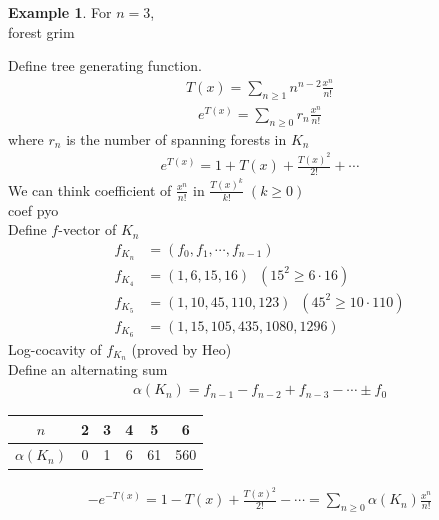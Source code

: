 \documentclass{article}
\theoremstyle{definition}
\newtheorem{ex}{Example}[]
\begin{document}
\begin{ex}
    For $n=3$, \\ 
    forest grim
\end{ex}
Define tree generating function. 
\begin{align*}
    T(x) = \sum_{n \ge 1} n^{n-2} \frac{x^n}{n!} 
\end{align*}
\begin{align*}
    e^{T(x)} = \sum_{n\ge 0} r_n \frac{x^n}{n!} 
\end{align*}
where $r_n$ is the number of spanning forests in $K_n$
\begin{align*}
    e^{T(x)} = 1 + T(x) + \frac{T(x)^2}{2!} + \cdots
\end{align*}
We can think coefficient of $\frac{x^n}{n!}$ in $\frac{T(x)^k}{k!} \; (k\ge 0)$ \\ 
coef pyo \\ 
Define $f$-vector of $K_n$ 
\begin{align*}
    f_{K_n} &= (f_0, f_1, \cdots , f_{n-1}) \\ 
    f_{K_4} &= (1, 6, 15, 16) \;\; (15^2 \ge 6 \cdot 16)\\ 
    f_{K_5} &= (1, 10, 45, 110, 123)  \;\; (45^2 \ge 10 \cdot 110)\\ 
    f_{K_6} &= (1, 15, 105, 435, 1080, 1296)
\end{align*}
Log-cocavity of $f_{K_n}$ (proved by Heo) \\ 
Define an alternating sum 
\begin{align*}
    \alpha (K_n) = f_{n-1} - f_{n-2} + f_{n-3} - \cdots \pm f_0
\end{align*}
\begin{center}
    \begin{tabular}{c|ccccc}
        $n$ & 2 & 3 & 4 & 5 & 6 \\ 
        \hline 
        $\alpha(K_n)$ & 0 & 1 & 6 & 61 & 560
    \end{tabular}
\end{center}
\begin{align*}
    -e^{-T(x)} = 1 - T(x) + \frac{T(x)^2}{2!} - \cdots = \sum_{n\ge 0} 
    \alpha (K_n) \frac{x^n}{n!}
\end{align*}
\end{document}
